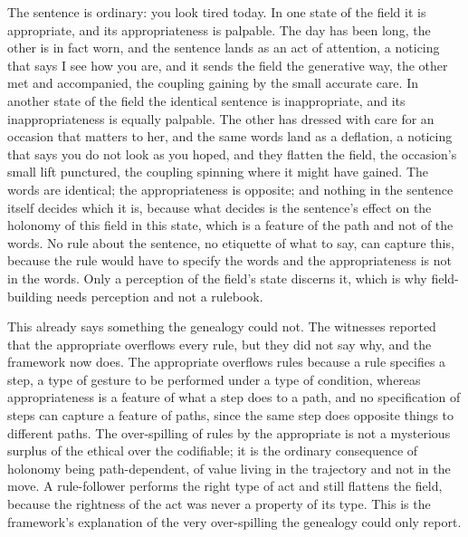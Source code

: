 \begin{casebox}
The sentence is ordinary: you look tired today. In one state of the field it is appropriate, and its appropriateness is palpable. The day has been long, the other is in fact worn, and the sentence lands as an act of attention, a noticing that says I see how you are, and it sends the field the generative way, the other met and accompanied, the coupling gaining by the small accurate care. In another state of the field the identical sentence is inappropriate, and its inappropriateness is equally palpable. The other has dressed with care for an occasion that matters to her, and the same words land as a deflation, a noticing that says you do not look as you hoped, and they flatten the field, the occasion's small lift punctured, the coupling spinning where it might have gained. The words are identical; the appropriateness is opposite; and nothing in the sentence itself decides which it is, because what decides is the sentence's effect on the holonomy of this field in this state, which is a feature of the path and not of the words. No rule about the sentence, no etiquette of what to say, can capture this, because the rule would have to specify the words and the appropriateness is not in the words. Only a perception of the field's state discerns it, which is why field-building needs perception and not a rulebook.
\end{casebox}

This already says something the genealogy could not. The witnesses reported that the appropriate overflows every rule, but they did not say why, and the framework now does. The appropriate overflows rules because a rule specifies a step, a type of gesture to be performed under a type of condition, whereas appropriateness is a feature of what a step does to a path, and no specification of steps can capture a feature of paths, since the same step does opposite things to different paths. The over-spilling of rules by the appropriate is not a mysterious surplus of the ethical over the codifiable; it is the ordinary consequence of holonomy being path-dependent, of value living in the trajectory and not in the move. A rule-follower performs the right type of act and still flattens the field, because the rightness of the act was never a property of its type. This is the framework's explanation of the very over-spilling the genealogy could only report.

